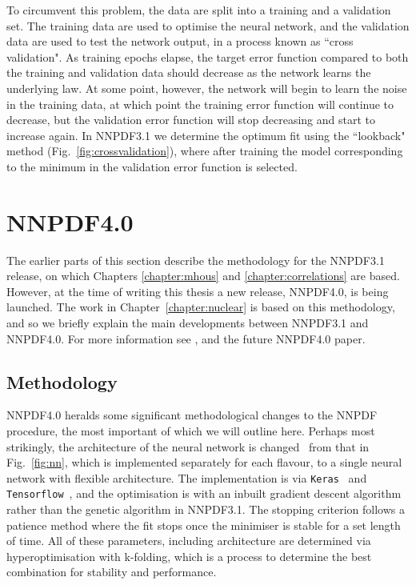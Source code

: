 
To circumvent this problem, the data are split into a training and a validation set. The training data are used to optimise the neural network, and the validation data are used to test the network output, in a process known as ``cross validation". As training epochs elapse, the target error function compared to both the training and validation data should decrease as the network learns the underlying law. At some point, however, the network will begin to learn the noise in the training data, at which point the training error function will continue to decrease, but the validation error function will stop decreasing and start to increase again. In NNPDF3.1 we determine the optimum fit using the ``lookback" method (Fig.~\ref{fig:crossvalidation}), where after training the model corresponding to the minimum in the validation error function is selected.

\section{NNPDF4.0}
The earlier parts of this section describe the methodology for the NNPDF3.1~\cite{Ball:2017nwa} release, on which Chapters \ref{chapter:mhous} and \ref{chapter:correlations} are based. However, at the time of writing this thesis a new release, NNPDF4.0, is being launched. The work in Chapter~\ref{chapter:nuclear} is based on this methodology, and so we briefly explain the main developments between NNPDF3.1 and NNPDF4.0. For more information see \cite{PDF4LHC, EmanueleTalk}, and the future NNPDF4.0 paper.

\subsection{Methodology}
NNPDF4.0 heralds some significant methodological changes to the NNPDF procedure, the most important of which we will outline here. Perhaps most strikingly, the architecture of the neural network is changed~\cite{Carrazza:2019mzf} from that in Fig.~\ref{fig:nn}, which is implemented separately for each flavour, to a single neural network with flexible architecture. The implementation is via \texttt{Keras}~\cite{keras} and \texttt{Tensorflow}~\cite{tensorflow}, and the optimisation is with an inbuilt gradient descent algorithm rather than the genetic algorithm in NNPDF3.1. The stopping criterion follows a patience method where the fit stops once the minimiser is stable for a set length of time. All of these parameters, including architecture are determined via hyperoptimisation with k-folding, which is a process to determine the best combination for stability and performance.

